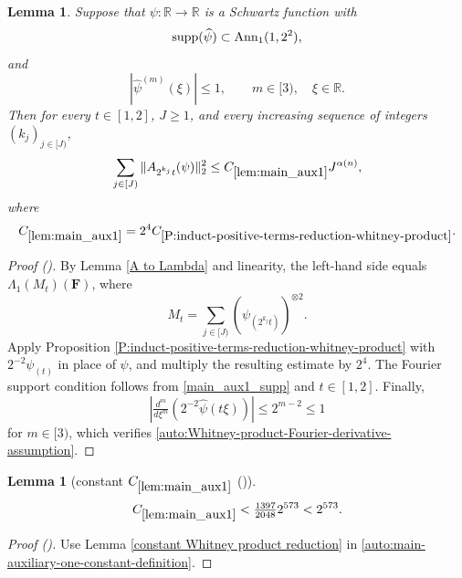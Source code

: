 \documentclass[12pt,reqno]{amsart}
\newcommand{\auto}{{({\tiny\faCar})}}
\theoremstyle{plain}
\newtheorem{lemma}[theorem]{Lemma}
\numberwithin{equation}{section}
\theoremstyle{remark}
\newcommand{\uses}[1]{}
\newcommand{\usesdefs}[1]{}
\newcommand{\R}{{\mathbb R}}
\newcommand{\F}{\mathbf{F}}
\begin{document}
\begin{lemma}\label{lem:main_aux1}\uses{A to Lambda,P:induct-positive-terms-reduction-whitney-product}\usesdefs{A_def,normalized function tuples,auto:prism-form-definition}
Suppose that $\psi:\R\to\R$ is a Schwartz function with
\begin{equation}\label{main_aux1_supp}
{\rm supp}(\widehat\psi)\subset\mathrm{Ann}_1(1,2^2),
\end{equation}
and
\begin{equation}\label{auto:main-auxiliary-one-Fourier-derivative-assumption}
|\widehat\psi^{(m)}(\xi)|\le1,
\qquad
m\in[3),
\quad
\xi\in\R.
\end{equation}
Then for every $t\in[1,2]$, $J\ge1$, and every increasing sequence of integers $(k_j)_{j\in[J)}$,
\begin{equation}\label{main_aux1}
\sum_{j\in[J)}\|A_{2^{k_j}t}(\psi)\|_2^2
\le C_{\ref{lem:main_aux1}}J^{\alpha(n)},
\end{equation}
where
\begin{equation}\label{auto:main-auxiliary-one-constant-definition}
C_{\ref{lem:main_aux1}}
=2^4C_{\ref{P:induct-positive-terms-reduction-whitney-product}}.
\end{equation}
\end{lemma}

\begin{proof}[Proof \auto]
By Lemma \ref{A to Lambda} and linearity, the left-hand side equals $\Lambda_1(M_t)(\F)$, where
\[
M_t=\sum_{j\in[J)}(\psi_{(2^{k_j}t)})^{\otimes2}.
\]
Apply Proposition \ref{P:induct-positive-terms-reduction-whitney-product} with $2^{-2}\psi_{(t)}$ in place of $\psi$, and multiply the resulting estimate by $2^4$. The Fourier support condition follows from \eqref{main_aux1_supp} and $t\in[1,2]$. Finally,
\[
\left|\tfrac{d^m}{d\xi^m}
\left(2^{-2}\widehat\psi(t\xi)\right)\right|
\le2^{m-2}\le1
\]
for $m\in[3)$, which verifies \eqref{auto:Whitney-product-Fourier-derivative-assumption}.
\end{proof}

\begin{lemma}[constant $C_{\ref{lem:main_aux1}}$ \auto]\label{constant main auxiliary one}\uses{constant Whitney product reduction,lem:main_aux1}\usesdefs{}
\begin{equation}\label{constant main auxiliary one bound}
C_{\ref{lem:main_aux1}}<\tfrac{1397}{2048}2^{573}<2^{573}.
\end{equation}
\end{lemma}
\begin{proof}[Proof \auto]
Use Lemma \ref{constant Whitney product reduction} in \eqref{auto:main-auxiliary-one-constant-definition}.
\end{proof}
\end{document}
